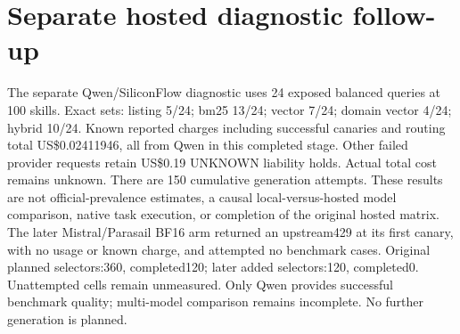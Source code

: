 \documentclass{article}
\begin{document}
\section{Separate hosted diagnostic follow-up}The separate Qwen/SiliconFlow diagnostic uses 24 exposed balanced queries at 100 skills. Exact sets: listing 5/24; bm25 13/24; vector 7/24; domain vector 4/24; hybrid 10/24. Known reported charges including successful canaries and routing total US\$0.02411946, all from Qwen in this completed stage. Other failed provider requests retain US\$0.19 UNKNOWN liability holds. Actual total cost remains unknown. There are 150 cumulative generation attempts. These results are not official-prevalence estimates, a causal local-versus-hosted model comparison, native task execution, or completion of the original hosted matrix. The later Mistral/Parasail BF16 arm returned an upstream429 at its first canary, with no usage or known charge, and attempted no benchmark cases. Original planned selectors:360, completed120; later added selectors:120, completed0. Unattempted cells remain unmeasured. Only Qwen provides successful benchmark quality; multi-model comparison remains incomplete. No further generation is planned.
\end{document}
